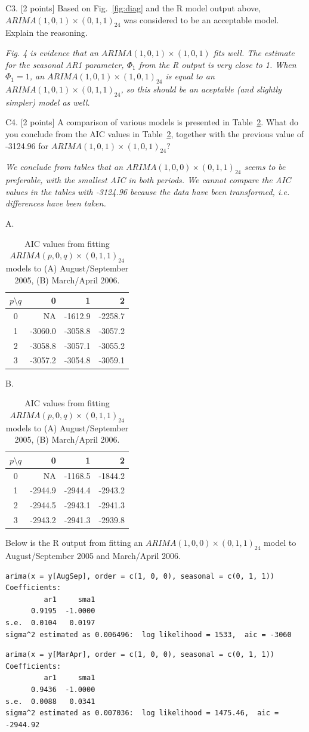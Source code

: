 \documentclass[11pt]{article}
\begin{document}

C3. [2 points] Based on  Fig.~\ref{fig:diag} and the R model output
above,  $ARIMA(1,0,1){\times}(0,1,1)_{24}$ was considered to be an
acceptable model. Explain the reasoning.

{\it
Fig. 4 is evidence that an $ARIMA(1,0,1)\times(1,0,1)$ fits well.
The estimate for the seasonal AR1 parameter, $\Phi_1$ from the R output is very close to 1. When
$\Phi_{1}=1$, an $ARIMA(1,0,1)\times(1,0,1)_{24}$ is equal to
an $ARIMA(1,0,1)\times(0,1,1)_{24}$, so this
should be  an aceptable (and slightly simpler) model as well.
}

C4. [2 points] A comparison of various models is presented in
Table~\ref{tab:aic}. What do you conclude from the AIC values in
Table~\ref{tab:aic}, together with the previous value of -3124.96
for $ARIMA(1,0,1){\times}(1,0,1)_{24}$?

{\it
We conclude from tables that an $ARIMA(1,0,0)\times(0,1,1)_{24}$
seems to be preferable, with the smallest AIC in both periods. We
cannot compare the AIC values in the tables with -3124.96 because
the data have been transformed, i.e. differences have been taken.}

\begin{table}[ht]
A.\begin{tabular}{c|rrr}
$p\setminus q$ &     0 &    1 &    2 \\
\hline
 0&     NA &-1612.9 &-2258.7\\
 1&-3060.0 &-3058.8 &-3057.2\\
 2&-3058.8 &-3057.1 &-3055.2\\
3&-3057.2 &-3054.8 &-3059.1
\end{tabular}
\hspace{0.5in}
B. \begin{tabular}{c|rrr}
 $p\setminus q$ &     0 &    1 &    2 \\
\hline
 0&     NA &-1168.5 &-1844.2\\
 1&-2944.9 &-2944.4 &-2943.2\\
 2&-2944.5 &-2943.1 &-2941.3\\
3 &-2943.2 &-2941.3 &-2939.8
\end{tabular}
\caption{AIC values from fitting $ARIMA(p,0,q){\times}(0,1,1)_{24}$ models to (A) August/September 2005, (B) March/April 2006.}\label{tab:aic}
\end{table}

Below is the R output from fitting an $ARIMA(1,0,0){\times}(0,1,1)_{24}$ model to August/September 2005 and March/April 2006.
\begin{verbatim}
arima(x = y[AugSep], order = c(1, 0, 0), seasonal = c(0, 1, 1))
Coefficients:
         ar1     sma1
      0.9195  -1.0000
s.e.  0.0104   0.0197
sigma^2 estimated as 0.006496:  log likelihood = 1533,  aic = -3060
\end{verbatim}
\begin{verbatim}
arima(x = y[MarApr], order = c(1, 0, 0), seasonal = c(0, 1, 1))
Coefficients:
         ar1     sma1
      0.9436  -1.0000
s.e.  0.0088   0.0341
sigma^2 estimated as 0.007036:  log likelihood = 1475.46,  aic = -2944.92
\end{verbatim}
\end{document}
